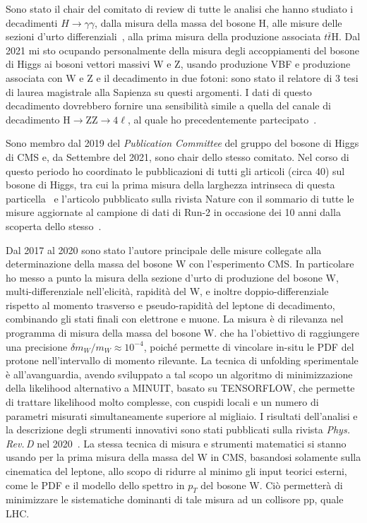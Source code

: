 \documentclass[a4paper,12pt,twoside]{article}
\begin{document}
{  Sono stato il chair del comitato di review di tutte le analisi che
  hanno studiato i decadimenti $H\to\gamma\gamma$, dalla misura della
  massa del bosone H, alle misure delle sezioni d'urto
  differenziali~\cite{CMS:2021kom}, alla prima misura della produzione
  associata $t\bar{t}$H.  Dal 2021 mi sto ocupando personalmente della
  misura degli accoppiamenti del bosone di Higgs ai bosoni vettori
  massivi W e Z, usando produzione VBF e produzione associata con W e
  Z e il decadimento in due fotoni: sono stato il relatore di 3 tesi
  di laurea magistrale alla Sapienza su questi argomenti. I dati di
  questo decadimento dovrebbero fornire una sensibilit\`a simile a
  quella del canale di decadimento H$\to$ZZ$\to 4\ell$, al quale ho
  precedentemente partecipato~\cite{CMS:2021nnc}.
  
  Sono membro dal 2019 del {\it Publication Committee} del gruppo del
  bosone di Higgs di CMS e, da Settembre del 2021, sono chair dello
  stesso comitato. Nel corso di questo periodo ho coordinato le
  pubblicazioni di tutti gli articoli (circa 40) sul bosone di Higgs,
  tra cui la prima misura della larghezza intrinseca di questa
  particella~\cite{CMS:2022ley} e l'articolo pubblicato sulla rivista
  Nature con il sommario di tutte le misure aggiornate al campione di
  dati di Run-2 in occasione dei 10 anni dalla scoperta dello
  stesso~\cite{CMS:2022dwd}.

  Dal 2017 al 2020 sono stato l'autore principale delle misure
  collegate alla determinazione della massa del bosone W con
  l'esperimento CMS. In particolare ho messo a punto la misura della
  sezione d'urto di produzione del bosone W, multi-differenziale
  nell'elicit\`a, rapidit\`a del W, e inoltre doppio-differenziale
  rispetto al momento trasverso e pseudo-rapidit\`a del leptone di
  decadimento, combinando gli stati finali con elettrone e muone. La
  misura \`e di rilevanza nel programma di misura della massa del
  bosone W. che ha l'obiettivo di raggiungere una precisione $\delta
  m_W/m_W\approx 10^{-4}$, poich\'e permette di vincolare in-situ le
  PDF del protone nell'intervallo di momento rilevante. La tecnica di
  unfolding sperimentale \`e all'avanguardia, avendo sviluppato a tal
  scopo un algoritmo di minimizzazione della likelihood alternativo a
  \textsc{MINUIT}, basato su \textsc{TENSORFLOW}, che permette di
  trattare likelihood molto complesse, con cuspidi locali e un numero
  di parametri misurati simultaneamente superiore al migliaio. I
  risultati dell'analisi e la descrizione degli strumenti innovativi
  sono stati pubblicati sulla rivista \textit{Phys.\,Rev.\,D} nel
  2020~\cite{CMS:2020cph}. La stessa tecnica di misura e strumenti
  matematici si stanno usando per la prima misura della massa del W in
  CMS, basandosi solamente sulla cinematica del leptone, allo scopo di
  ridurre al minimo gli input teorici esterni, come le PDF e il
  modello dello spettro in $p_T$ del bosone W.  Ci\`o permetter\`a di
  minimizzare le sistematiche dominanti di tale misura ad un collisore
  pp, quale LHC.

}
\end{document}
